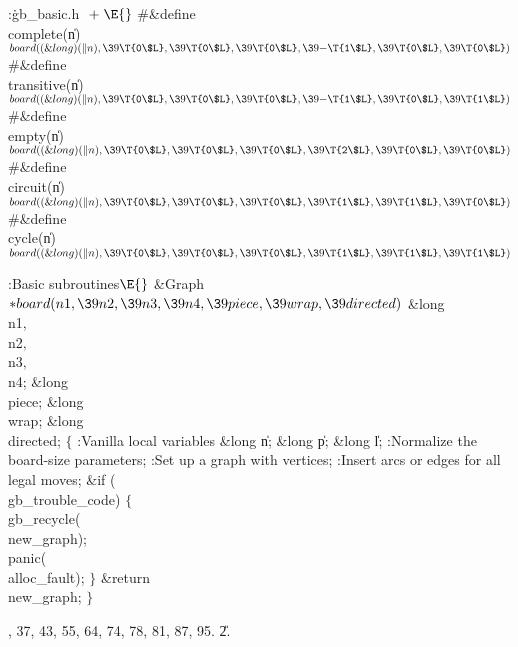 \Y\B\4:\.{gb\_basic.h }\X${}\mathrel+\E{}$\6
\8\#\&{define} \\{complete}(\|n) \5${}\\{board}((\&{long})(\|n),\39\T{0\$L},\39%
\T{0\$L},\39\T{0\$L},\39{-}\T{1\$L},\39\T{0\$L},\39\T{0\$L}){}$\6
\8\#\&{define} \\{transitive}(\|n) \5${}\\{board}((\&{long})(\|n),\39\T{0\$L},%
\39\T{0\$L},\39\T{0\$L},\39{-}\T{1\$L},\39\T{0\$L},\39\T{1\$L}){}$\6
\8\#\&{define} \\{empty}(\|n) \5${}\\{board}((\&{long})(\|n),\39\T{0\$L},\39%
\T{0\$L},\39\T{0\$L},\39\T{2\$L},\39\T{0\$L},\39\T{0\$L}){}$\6
\8\#\&{define} \\{circuit}(\|n) \5${}\\{board}((\&{long})(\|n),\39\T{0\$L},\39%
\T{0\$L},\39\T{0\$L},\39\T{1\$L},\39\T{1\$L},\39\T{0\$L}){}$\6
\8\#\&{define} \\{cycle}(\|n) \5${}\\{board}((\&{long})(\|n),\39\T{0\$L},\39%
\T{0\$L},\39\T{0\$L},\39\T{1\$L},\39\T{1\$L},\39\T{1\$L}){}$\par
\fi

\B{}:Basic subroutines\X${}\E{}$\6
\&{Graph} ${}{*}\\{board}(\\{n1},\39\\{n2},\39\\{n3},\39\\{n4},\39\\{piece},\39%
\\{wrap},\39\\{directed}){}$\1\1\6
\&{long} \\{n1}${},{}$ \\{n2}${},{}$ \\{n3}${},{}$ \\{n4};\6
\&{long} \\{piece};\6
\&{long} \\{wrap};\6
\&{long} \\{directed};\2\2\6
${}\{{}$\5
\1:Vanilla local variables\X\5
\hbox{}\6{}\&{long} \|n;\6
\&{long} \|p;\6
\&{long} \|l;\7
:Normalize the board-size parameters\X;\6
:Set up a graph with  vertices\X;\6
:Insert arcs or edges for all legal moves\X;\6
\&{if} (\\{gb\_trouble\_code})\5
${}\{{}$\1\6
\\{gb\_recycle}(\\{new\_graph});\6
\\{panic}(\\{alloc\_fault});\6
\4${}\}{}$\2\6
\&{return} \\{new\_graph};\6
\4${}\}{}$\2\par
{}, 37, 43, 55, 64, 74, 78, 81, 87, 95.
\U2.\fi

